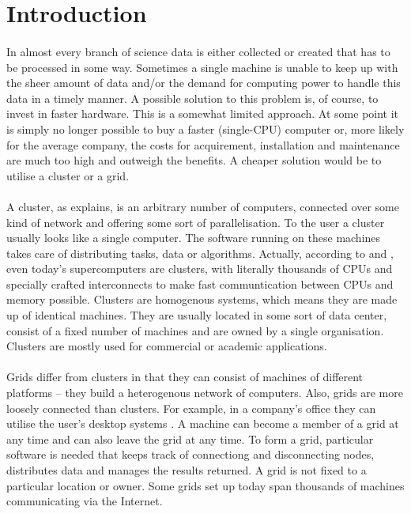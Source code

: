 \section{Introduction}
\paragraph{}
In almost every branch of science data is either collected or created that has to be processed in some way. Sometimes a single machine is unable to keep up with the sheer amount of data and/or the demand for computing power to handle this data in a timely manner. A possible solution to this problem is, of course, to invest in faster hardware. This is a somewhat limited approach. At some point it is simply no longer possible to buy a faster (single-CPU) computer or, more likely for the average company, the costs for acquirement, installation and maintenance are much too high and outweigh the benefits. A cheaper solution would be to utilise a cluster or a grid.
\paragraph{}
A cluster, as  explains, is an arbitrary number of computers, connected over some kind of network and offering some sort of parallelisation. To the user a cluster usually looks like a single computer. The software running on these machines takes care of distributing tasks, data or algorithms. Actually, according to  and , even today's supercomputers are clusters, with literally thousands of CPUs and specially crafted interconnects to make fast communtication between CPUs and memory possible. Clusters are homogenous systems, which means they are made up of identical machines. They are usually located in some sort of data center, consist of a fixed number of machines and are owned by a single organisation. Clusters are mostly used for commercial or academic applications.
\paragraph{}
Grids differ from clusters in that they can consist of machines of different platforms -- they build a heterogenous network of computers. Also, grids are more loosely connected than clusters. For example, in a company's office they can utilise the user's desktop systems \cite{wikipedia005}. A machine can become a member of a grid at any time and can also leave the grid at any time. To form a grid, particular software is needed that keeps track of connectiong and disconnecting nodes, distributes data and manages the results returned. A grid is not fixed to a particular location or owner. Some grids set up today span thousands of machines communicating via the Internet.
